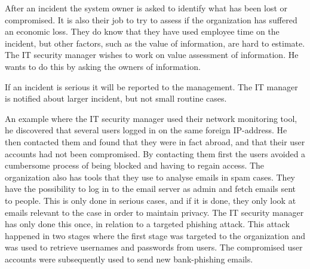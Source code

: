 After an incident the system owner is asked to identify what has been lost or compromised. It is also their job to try to assess if the organization has suffered an economic loss. They do know that they have used employee time on the incident, but other factors, such as the value of information, are hard to estimate. The IT security manager wishes to work on value assessment of information. He wants to do this by asking the owners of information.

If an incident is serious it will be reported to the management. The IT manager is notified about larger incident, but not small routine cases.

An example where the IT security manager used their network monitoring tool, he discovered that several users logged in on the same foreign IP-address. He then contacted them and found that they were in fact abroad, and that their user accounts had not been compromised. By contacting them first the users avoided a cumbersome process of being blocked and having to regain access. The organization also has tools that they use to analyse emails in spam cases. They have the possibility to log in to the email server as admin and fetch emails sent to people. This is only done in serious cases, and if it is done, they only look at emails relevant to the case in order to maintain privacy. The IT security manager has only done this once, in relation to a targeted phishing attack. This attack happened in two stages where the first stage was targeted to the organization and was used to retrieve usernames and passwords from users. The compromised user accounts were subsequently used to send new bank-phishing emails.

